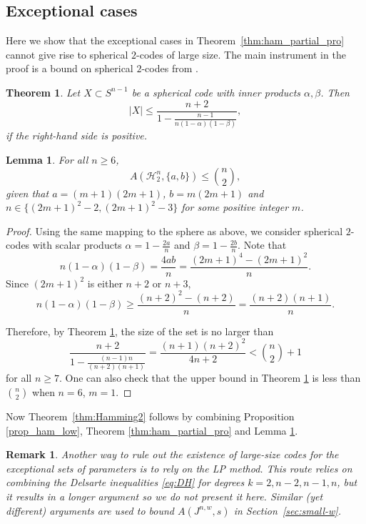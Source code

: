 \documentclass{amsart}
\newtheorem{lemmaenv}[definitionenv]{Lemma}
\newtheorem{theoremenv}[definitionenv]{Theorem}
\newtheorem{remarkenv}[definitionenv]{Remark}
\newenvironment{remark}{\begin{remarkenv}\rm}{\end{remarkenv}}
\newenvironment{lemma}{\begin{lemmaenv}\rm}{\end{lemmaenv}}
\newenvironment{theorem}{\begin{theoremenv}\rm}{\end{theoremenv}}
\newcommand{\cH}{\mathcal{H}}
\begin{document}
\subsection{Exceptional cases} \label{sec:EC}

Here we show that the exceptional cases in Theorem~\ref{thm:ham_partial_pro} cannot give rise to spherical $2$-codes of large size. The main instrument in the proof is a bound on spherical $2$-codes from \cite{GY18}.

\begin{theorem}\cite[Corollary 4]{GY18}\label{thm:2-dist}
Let $X\subset S^{n-1}$ be a spherical code with inner products $\alpha,\beta$. Then
$$|X|\leq \dfrac {n+2}{1-\frac {n-1}{n(1-\alpha)(1-\beta)}},$$
if the right-hand side is positive.
\end{theorem}

\begin{lemma}\label{lem:no_exceptions}
For all $n\geq 6$,
\begin{equation*}
    A(\cH_{2}^{n}, \{a, b\}) \leq \binom{n}{2},
\end{equation*}
given that $a = (m+1)(2m+1)$, $b = m(2m+1)$ and $n \in \{(2m+1)^{2}-2, (2m+1)^{2}-3\}$ for some positive integer $m$.
\end{lemma}

\begin{proof}
Using the same mapping to the sphere as above, we consider spherical $2$-codes with scalar products $\alpha=1-\frac {2a} {n}$ and $\beta=1-\frac {2b} n$. Note that
$$n(1-\alpha)(1-\beta) = \frac {4ab} {n} = \frac {(2m+1)^4-(2m+1)^2} {n}.$$
Since $(2m+1)^2$ is either $n+2$ or $n+3$,
$$n(1-\alpha)(1-\beta)\geq \frac {(n+2)^2-(n+2)} {n} = \frac{(n+2)(n+1)} {n}.$$

Therefore, by Theorem \ref{thm:2-dist}, the size of the set is no larger than
$$\frac {n+2} {1 - \frac {(n-1)n} {(n+2)(n+1)}} = \frac {(n+1)(n+2)^2} {4n+2} < \binom{n}{2} + 1$$
for all $n\geq 7$. One can also check that the upper bound in Theorem \ref{thm:2-dist} is less than $\binom{n}{2}$ when $n = 6$, $m = 1$.
\end{proof}

Now Theorem~\ref{thm:Hamming2} follows by combining Proposition \ref{prop_ham_low}, Theorem \ref{thm:ham_partial_pro} and Lemma \ref{lem:no_exceptions}.

\begin{remark}
Another way to rule out the existence of large-size codes for the exceptional sets of parameters is to rely on the LP method. This route relies on combining the Delsarte inequalities \eqref{eq:DH} for degrees $k=2,n-2,n-1,n$, but it results
in a longer argument so we do not present it here. Similar (yet different) arguments are used to bound $A(J^{n,w},s)$
in Section~\ref{sec:small-w}.
\end{remark}
\end{document}
